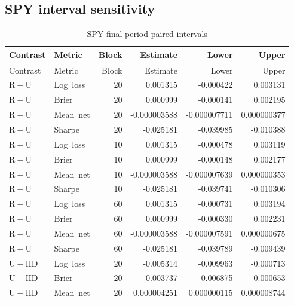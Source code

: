 \subsection{SPY interval sensitivity}
\begingroup\small\setlength{\tabcolsep}{10pt}\begin{longtable}{llrrrr}
\caption{SPY final-period paired intervals}\\
\toprule Contrast & Metric & Block & Estimate & Lower & Upper\\\midrule\endfirsthead
\toprule Contrast & Metric & Block & Estimate & Lower & Upper\\\midrule\endhead
\mbox{$\mathrm{R}-\mathrm{U}$} & \mbox{Log loss} & 20 & 0.001315 & -0.000422 & 0.003131\\
\mbox{$\mathrm{R}-\mathrm{U}$} & \mbox{Brier} & 20 & 0.000999 & -0.000141 & 0.002195\\
\mbox{$\mathrm{R}-\mathrm{U}$} & \mbox{Mean net} & 20 & -0.000003588 & -0.000007711 & 0.000000377\\
\mbox{$\mathrm{R}-\mathrm{U}$} & \mbox{Sharpe} & 20 & -0.025181 & -0.039985 & -0.010388\\
\mbox{$\mathrm{R}-\mathrm{U}$} & \mbox{Log loss} & 10 & 0.001315 & -0.000478 & 0.003119\\
\mbox{$\mathrm{R}-\mathrm{U}$} & \mbox{Brier} & 10 & 0.000999 & -0.000148 & 0.002177\\
\mbox{$\mathrm{R}-\mathrm{U}$} & \mbox{Mean net} & 10 & -0.000003588 & -0.000007639 & 0.000000353\\
\mbox{$\mathrm{R}-\mathrm{U}$} & \mbox{Sharpe} & 10 & -0.025181 & -0.039741 & -0.010306\\
\mbox{$\mathrm{R}-\mathrm{U}$} & \mbox{Log loss} & 60 & 0.001315 & -0.000731 & 0.003194\\
\mbox{$\mathrm{R}-\mathrm{U}$} & \mbox{Brier} & 60 & 0.000999 & -0.000330 & 0.002231\\
\mbox{$\mathrm{R}-\mathrm{U}$} & \mbox{Mean net} & 60 & -0.000003588 & -0.000007591 & 0.000000675\\
\mbox{$\mathrm{R}-\mathrm{U}$} & \mbox{Sharpe} & 60 & -0.025181 & -0.039789 & -0.009439\\
\mbox{$\mathrm{U}-\mathrm{IID}$} & \mbox{Log loss} & 20 & -0.005314 & -0.009963 & -0.000713\\
\mbox{$\mathrm{U}-\mathrm{IID}$} & \mbox{Brier} & 20 & -0.003737 & -0.006875 & -0.000653\\
\mbox{$\mathrm{U}-\mathrm{IID}$} & \mbox{Mean net} & 20 & 0.000004251 & 0.000000115 & 0.000008744\\

\end{longtable}

